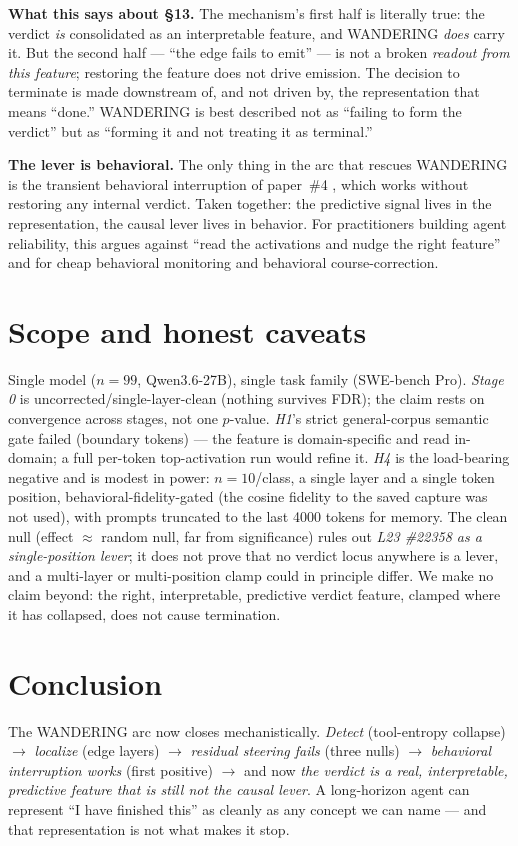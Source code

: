 \documentclass[11pt]{article}
\begin{document}
\textbf{What this says about \S13.} The mechanism's first half is literally true: the verdict \emph{is} consolidated as an interpretable feature, and WANDERING \emph{does} carry it. But the second half --- ``the edge fails to emit'' --- is not a broken \emph{readout from this feature}; restoring the feature does not drive emission. The decision to terminate is made downstream of, and not driven by, the representation that means ``done.'' WANDERING is best described not as ``failing to form the verdict'' but as ``forming it and not treating it as terminal.''

\textbf{The lever is behavioral.} The only thing in the arc that rescues WANDERING is the transient behavioral interruption of paper~\#4 \cite{modality}, which works without restoring any internal verdict. Taken together: the predictive signal lives in the representation, the causal lever lives in behavior. For practitioners building agent reliability, this argues against ``read the activations and nudge the right feature'' and for cheap behavioral monitoring and behavioral course-correction.

\section{Scope and honest caveats}\label{sec:scope}
Single model ($n{=}99$, Qwen3.6-27B), single task family (SWE-bench Pro). \emph{Stage 0} is uncorrected/single-layer-clean (nothing survives FDR); the claim rests on convergence across stages, not one $p$-value. \emph{H1}'s strict general-corpus semantic gate failed (boundary tokens) --- the feature is domain-specific and read in-domain; a full per-token top-activation run would refine it. \emph{H4} is the load-bearing negative and is modest in power: $n{=}10$/class, a single layer and a single token position, behavioral-fidelity-gated (the cosine fidelity to the saved capture was not used), with prompts truncated to the last 4000 tokens for memory. The clean null (effect $\approx$ random null, far from significance) rules out \emph{L23 \#22358 as a single-position lever}; it does not prove that no verdict locus anywhere is a lever, and a multi-layer or multi-position clamp could in principle differ. We make no claim beyond: the right, interpretable, predictive verdict feature, clamped where it has collapsed, does not cause termination.

\section{Conclusion}\label{sec:conclusion}
The WANDERING arc now closes mechanistically. \emph{Detect} (tool-entropy collapse) $\to$ \emph{localize} (edge layers) $\to$ \emph{residual steering fails} (three nulls) $\to$ \emph{behavioral interruption works} (first positive) $\to$ and now \emph{the verdict is a real, interpretable, predictive feature that is still not the causal lever}. A long-horizon agent can represent ``I have finished this'' as cleanly as any concept we can name --- and that representation is not what makes it stop.
\end{document}
